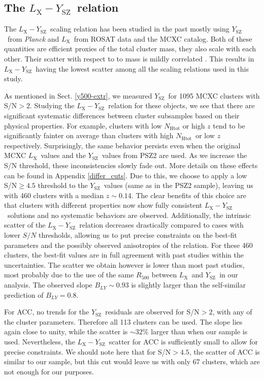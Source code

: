 \documentclass{aa}   %
\newcommand{\LY}{$L_{\text{X}}-Y_{\text{SZ}}$}
\newcommand{\Lx}{$L_{\text{X}}$}
\newcommand{\Ysz}{$Y_{\text{SZ}}$}
\newcommand{\nhtot}{$N_{\text{Htot}}$}
\begin{document}
\subsection{The \LY\ relation}

The \LY\ scaling relation has been studied in the past \citep[e.g.,][]{morandi,planck11,planck11b,demartino,ettori20,pratt20} mostly using \Ysz\ from \textit{Planck} and \Lx\ from ROSAT data and the MCXC catalog. Both of these quantities are efficient proxies of the total cluster mass, they also scale with each other. Their scatter with respect to to mass is mildly correlated \citep[e.g.,][]{aarti}. This results in \LY\ having the lowest scatter among all the scaling relations used in this study. 

As mentioned in Sect. \ref{y500-extr}, we measured \Ysz\ for 1095 MCXC clusters with S/N$>2$. Studying the \LY\ relation for these objects, we see that there are significant systematic differences between cluster subsamples based on their physical properties. For example, clusters with low $N_{\text{Htot}}$ or high $z$ tend to be significantly fainter on average than clusters with high \nhtot\ or low $z$ respectively. Surprisingly, the same behavior persists even when the original MCXC \Lx\ values and the \Ysz\ values from PSZ2 are used. As we increase the S/N threshold, these inconsistencies slowly fade out. More details on these effects can be found in Appendix \ref{differ_cuts}. Due to this, we choose to apply a low S/N$\geq 4.5$ threshold to the \Ysz\ values (same as in the PSZ2 sample), leaving us with 460 clusters with a median $z\sim0.14$. The clear benefits of this choice are that clusters with different properties now show fully consistent \LY\ solutions and no systematic behaviors are observed. Additionally, the intrinsic scatter of the \LY\ relation decreases drastically compared to cases with lower $S/N$ thresholds, allowing us to put precise constraints on the best-fit parameters and the possibly observed anisotropies of the relation. For these 460 clusters, the best-fit values are in full agreement with past studies within the uncertainties. The scatter we obtain however is lower than most past studies, most probably due to the use of the same $R_{500}$ between \Lx\ and \Ysz\ in our analysis. The observed slope $B_{LY}\sim0.93$ is slightly larger than the self-similar prediction of $B_{LY}=0.8$. 

For ACC, no trends for the \Ysz\ residuals are observed for S/N$>2$, with any of the cluster parameters. Therefore all 113 clusters can be used. The slope lies again close to unity, while the scatter is $\sim 32\%$ larger than when our sample is used. Nevertheless, the \LY\ scatter for ACC is sufficiently small to allow for precise constraints. We should note here that for S/N$>4.5$, the scatter of ACC is similar to our sample, but this cut would leave us with only 67 clusters, which are not enough for our purposes. 
\end{document}
